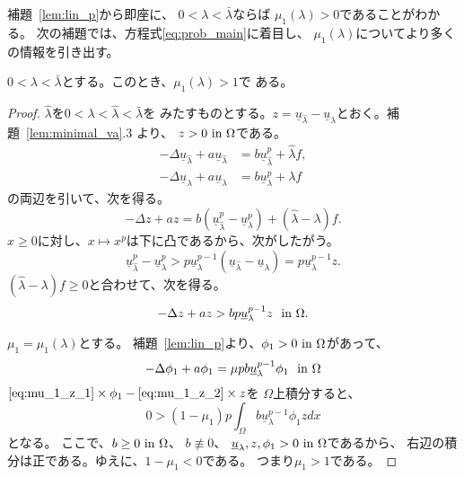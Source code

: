 補題~\ref{lem:lin_p}から即座に、
$0 < \lambda < \bar{\lambda}$ならば
$\mu_1(\lambda) > 0$であることがわかる。
次の補題では、方程式\ref{eq:prob_main}に着目し、
$\mu_1(\lambda)$についてより多くの情報を引き出す。

\begin{lem} \label{lem:lin_1}
 $0 < \lambda < \bar{\lambda}$とする。このとき、$\mu_1(\lambda) > 1$で
 ある。
\end{lem}

\begin{proof}
 $\hat{\lambda}$を$0 < \lambda < \hat{\lambda} < \bar{\lambda}$を
 みたすものとする。$z = \underline{u}_{\hat{\lambda}} -
 \underline{u}_\lambda$とおく。補題~\ref{lem:minimal_va}.3 より、
 $z > 0 ~\text{in}~ \Omega$である。
 \begin{align*}
  -\Delta \underline{u}_{\hat{\lambda}} + a \underline{u}_{\hat{\lambda}} &= b
  \underline{u}_{\hat{\lambda}}^p + \hat{\lambda} f, \\   
  -\Delta \underline{u}_{\lambda} + a \underline{u}_\lambda &= b
  \underline{u}_\lambda^p + \lambda f
 \end{align*}
 の両辺を引いて、次を得る。
 \[
  -\Delta z + az = b (\underline{u}_{\hat{\lambda}}^p -
 \underline{u}_\lambda^p)
 + (\hat{\lambda} - \lambda) f.
 \]
 $x \geq 0$に対し、$x \mapsto x^p$は下に凸であるから、次がしたがう。
 \[
  \underline{u}_{\hat{\lambda}}^p - \underline{u}_\lambda^p > 
 p \underline{u}_\lambda^{p-1} (\underline{u}_{\hat{\lambda}} -
 \underline{u}_\lambda) = p \underline{u}_\lambda^{p-1} z.
 \]
 $(\hat{\lambda} - \lambda) f \geq 0$と合わせて、次を得る。
 \begin{equation}
  -\Delta z + az > bp \underline{u}_\lambda^{p-1} z  \ \ \text{in}~ \Omega.
   \label{eq:mu_1_z_1}
 \end{equation}

 $\mu_1 = \mu_1(\lambda)$とする。
 補題~\ref{lem:lin_p}より、$\phi_1 > 0 ~\text{in}~ \Omega$があって、
 \begin{equation}
  -\Delta \phi_1 + a \phi_1 =
   \mu p b \underline{u}_\lambda^{p-1} \phi_1  \ \ \text{in}~ \Omega
   \label{eq:mu_1_z_2}
 \end{equation}
 $ \text{\eqref{eq:mu_1_z_1}} \times \phi_1 - 
 \text{\eqref{eq:mu_1_z_2}} \times z$を
 $\Omega$上積分すると、
 \[
  0 > (1 - \mu_1) p \int_\Omega b \underline{u}_\lambda^{p-1} \phi_1 z dx
 \]
 となる。
 ここで、$b \geq 0 ~\text{in}~ \Omega$、
 $b \not \equiv 0$、
 $\underline{u}_\lambda, z, \phi_1 > 0 ~\text{in}~ \Omega$であるから、
 右辺の積分は正である。ゆえに、$1 - \mu_1 < 0$である。
 つまり$\mu_1 > 1$である。 \qedhere
\end{proof}


